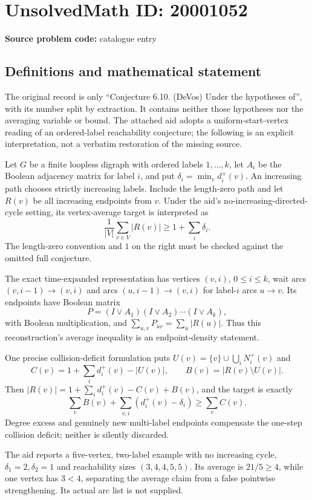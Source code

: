 \documentclass[11pt]{article}
\begin{document}
\section*{UnsolvedMath ID: 20001052}
\textbf{Source problem code:} catalogue entry
\subsection{Definitions and mathematical statement}
The original record is only ``Conjecture 6.10. (DeVos) Under the hypotheses of'', with its number split by extraction. It contains neither those hypotheses nor the averaging variable or bound. The attached aid adopts a uniform-start-vertex reading of an ordered-label reachability conjecture; the following is an explicit interpretation, not a verbatim restoration of the missing source.

Let $G$ be a finite loopless digraph with ordered labels $1,\ldots,k$, let $A_i$ be the Boolean adjacency matrix for label $i$, and put $\delta_i=\min_vd_i^+(v)$. An increasing path chooses strictly increasing labels. Include the length-zero path and let $R(v)$ be all increasing endpoints from $v$. Under the aid's no-increasing-directed-cycle setting, its vertex-average target is interpreted as
\[
\frac1{|V|}\sum_{v\in V}|R(v)|\ge1+\sum_i\delta_i.
\]
The length-zero convention and $1$ on the right must be checked against the omitted full conjecture.

The exact time-expanded representation has vertices $(v,i)$, $0\le i\le k$, wait arcs $(v,i-1)\to(v,i)$ and arcs $(u,i-1)\to(v,i)$ for label-$i$ arcs $u\to v$. Its endpoints have Boolean matrix
\[
P=(I\vee A_1)(I\vee A_2)\cdots(I\vee A_k),
\]
with Boolean multiplication, and $\sum_{u,v}P_{uv}=\sum_u|R(u)|$. Thus this reconstruction's average inequality is an endpoint-density statement.

One precise collision-deficit formulation puts $U(v)=\{v\}\cup\bigcup_iN_i^+(v)$ and
\[
C(v)=1+\sum_i d_i^+(v)-|U(v)|,\qquad B(v)=|R(v)\setminus U(v)|.
\]
Then $|R(v)|=1+\sum_i d_i^+(v)-C(v)+B(v)$, and the target is exactly
\[
\sum_vB(v)+\sum_{v,i}(d_i^+(v)-\delta_i)\ge\sum_vC(v).
\]
Degree excess and genuinely new multi-label endpoints compensate the one-step collision deficit; neither is silently discarded.

The aid reports a five-vertex, two-label example with no increasing cycle, $\delta_1=2,\delta_2=1$ and reachability sizes $(3,4,4,5,5)$. Its average is $21/5\ge4$, while one vertex has $3<4$, separating the average claim from a false pointwise strengthening. Its actual arc list is not supplied.
\end{document}
